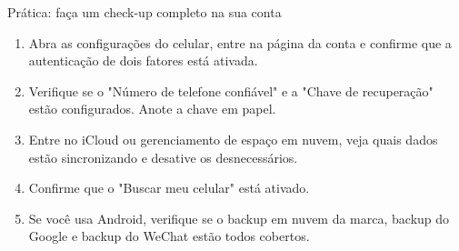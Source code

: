 \begin{tcbpractice}{Prática: faça um check-up completo na sua conta}
\begin{enumerate}
  \item Abra as configurações do celular, entre na página da conta e confirme que a autenticação de dois fatores está ativada.
  \item Verifique se o "Número de telefone confiável" e a "Chave de recuperação" estão configurados. Anote a chave em papel.
  \item Entre no iCloud ou gerenciamento de espaço em nuvem, veja quais dados estão sincronizando e desative os desnecessários.
  \item Confirme que o "Buscar meu celular" está ativado.
  \item Se você usa Android, verifique se o backup em nuvem da marca, backup do Google e backup do WeChat estão todos cobertos.
\end{enumerate}

\end{tcbpractice}
